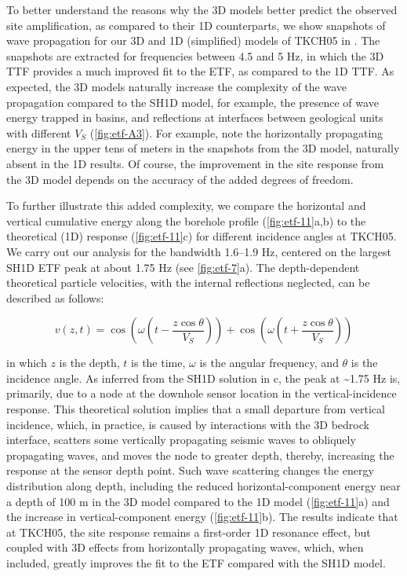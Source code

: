 To better understand the reasons why the 3D models better predict the observed site amplification, as compared to their 1D counterparts, we show snapshots of wave propagation for our 3D and 1D (simplified) models of TKCH05 in . The snapshots are extracted for frequencies between 4.5 and 5 Hz, in which the 3D TTF provides a much improved fit to the ETF, as compared to the 1D TTF. As expected, the 3D models naturally increase the complexity of the wave propagation compared to the SH1D model, for example, the presence of wave energy trapped in basins, and reflections at interfaces between geological units with different $V_S$ (\cref{fig:etf-A3}). For example, note the horizontally propagating energy in the upper tens of meters in the snapshots from the 3D model, naturally absent in the 1D results. Of course, the improvement in the site response from the 3D model depends on the accuracy of the added degrees of freedom.

To further illustrate this added complexity, we compare the horizontal and vertical cumulative energy along the borehole profile (\cref{fig:etf-11}a,b) to the theoretical (1D) response (\cref{fig:etf-11}c) for different incidence angles at TKCH05. We carry out our analysis for the bandwidth 1.6–1.9 Hz, centered on the largest SH1D ETF peak at about 1.75 Hz (see  \cref{fig:etf-7}a). The depth-dependent theoretical particle velocities, with the internal reflections neglected, can be described as follows:

\begin{equation}\label{eq:etf-6}
  v(z, t)=\cos \left(\omega\left(t-\frac{z \cos \theta}{V_{S}}\right)\right)+\cos \left(\omega\left(t+\frac{z \cos \theta}{V_{S}}\right)\right)
\end{equation}

\noindent in which $z$ is the depth, $t$ is the time, $\omega$ is the angular frequency, and $\theta$ is the incidence angle. As inferred from the SH1D solution in c, the peak at \textasciitilde 1.75 Hz is, primarily, due to a node at the downhole sensor location in the vertical-incidence response. This theoretical solution implies that a small departure from vertical incidence, which, in practice, is caused by interactions with the 3D bedrock interface, scatters some vertically propagating seismic waves to obliquely propagating waves, and moves the node to greater depth, thereby, increasing the response at the sensor depth point. Such wave scattering changes the energy distribution along depth, including the reduced horizontal-component energy near a depth of 100 m in the 3D model compared to the 1D model (\cref{fig:etf-11}a) and the increase in vertical-component energy (\cref{fig:etf-11}b). The results indicate that at TKCH05, the site response remains a first-order 1D resonance effect, but coupled with 3D effects from horizontally propagating waves, which, when included, greatly improves the fit to the ETF compared with the SH1D model.

